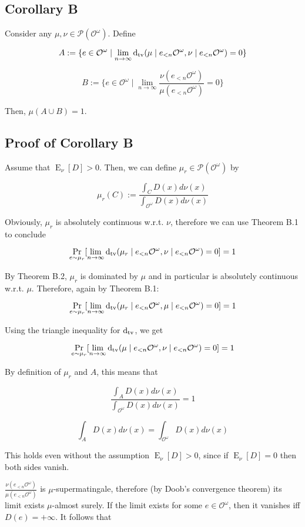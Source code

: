 \documentclass[a4paper]{article}
\DeclareMathOperator{\Prb}{Pr}
\DeclareMathOperator{\E}{E}
\newcommand{\Dtv}{\operatorname{d}_{\textnormal{tv}}}
\newcommand{\Prob}{\mathcal{P}}
\newcommand{\Obs}{\mathcal{O}}
\newcommand{\ObsO}{\Obs^\omega}
\begin{document}
\subsection{Corollary B}

Consider any ${\mu, \nu \in \Prob(\ObsO)}$. Define

$$A:=\{e \in \ObsO \mid \lim_{n \rightarrow \infty} \Dtv(\mu \mid e_{<n}\ObsO, \nu \mid e_{<n}\ObsO) = 0\}$$

$$B:=\{e \in \ObsO \mid \lim_{n \rightarrow \infty} \frac{\nu(e_{<n}\ObsO)}{\mu(e_{<n}\ObsO)} = 0\}$$

Then, ${\mu(A \cup B) = 1}$.

\subsection{Proof of Corollary B}

Assume that ${\E_\nu[D] > 0}$. Then, we can define ${\mu_r \in \Prob(\ObsO)}$ by

$$\mu_r(C):=\frac{\int_{C} D(x) d\nu(x)}{\int_{\ObsO} D(x) d\nu(x)}$$

Obviously, ${\mu_r}$ is absolutely continuous w.r.t. ${\nu}$, therefore we can use Theorem B.1 to conclude

$$\Prb_{e \sim \mu_r}[\lim_{n \rightarrow \infty} \Dtv(\mu_r \mid e_{<n}\ObsO, \nu \mid e_{<n}\ObsO) = 0] = 1$$

By Theorem B.2, ${\mu_r}$ is dominated by ${\mu}$ and in particular is absolutely continuous w.r.t. ${\mu}$. Therefore, again by Theorem B.1:

$$\Prb_{e \sim \mu_r}[\lim_{n \rightarrow \infty} \Dtv(\mu_r \mid e_{<n}\ObsO, \mu \mid e_{<n}\ObsO) = 0] = 1$$

Using the triangle inequality for ${\Dtv}$, we get

$$\Prb_{e \sim \mu_r}[\lim_{n \rightarrow \infty} \Dtv(\mu \mid e_{<n}\ObsO, \nu \mid e_{<n}\ObsO) = 0] = 1$$

By definition of ${\mu_r}$ and ${A}$, this means that

$$\frac{\int_{A} D(x) d\nu(x)}{\int_{\ObsO} D(x) d\nu(x)} = 1$$

$$\int_{A} D(x) d\nu(x) = \int_{\ObsO} D(x) d\nu(x)$$

This holds even without the assumption ${\E_\nu[D] > 0}$, since if ${\E_\nu[D] = 0}$ then both sides vanish.

${\frac{\nu(e_{<n}\ObsO)}{\mu(e_{<n}\ObsO)}}$ is ${\mu}$-supermatingale, therefore (by Doob's convergence theorem) its limit exists ${\mu}$-almost surely. If the limit exists for some ${e \in \ObsO}$, then it vanishes iff ${D(e)=+\infty}$. It follows that
\end{document}
